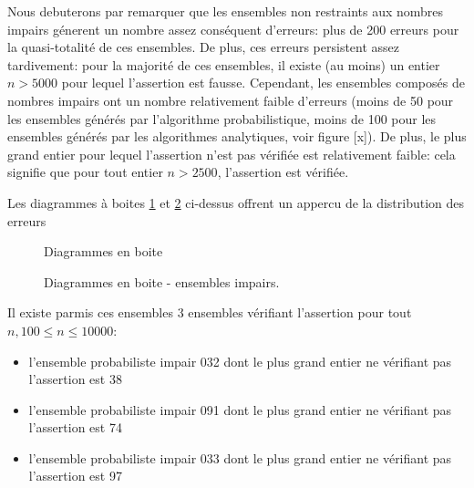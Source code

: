 \documentclass[../main.text]{report}
\begin{document}
Nous debuterons par remarquer que les ensembles non restraints aux nombres impairs génerent un nombre assez conséquent d'erreurs: plus de 200 erreurs pour la quasi-totalité de ces ensembles. 
De plus, ces erreurs persistent assez tardivement: pour la majorité de ces ensembles, il existe (au moins) un entier $n > 5000$ pour lequel l'assertion est fausse.
Cependant, les ensembles composés de nombres impairs ont un nombre relativement faible d'erreurs (moins de 50 pour les ensembles générés par l'algorithme probabilistique, moins de 100 pour les ensembles générés par les algorithmes analytiques, voir figure [x]). 
De plus, le plus grand entier pour lequel l'assertion n'est pas vérifiée est relativement faible: cela signifie que pour tout entier $n > 2500$, l'assertion est vérifiée.  


Les diagrammes à boites \ref{fig:boxplots} et \ref{fig:boxplots_Odd} ci-dessus offrent un appercu de la distribution des erreurs

\begin{figure}[H]
\centering
	\caption{Diagrammes en boite}
	\label{fig:boxplots}
\end{figure}

\begin{figure}[H]
\centering
	\caption{Diagrammes en boite - ensembles impairs.}
	\label{fig:boxplots_Odd}
\end{figure}
Il existe parmis ces ensembles 3 ensembles vérifiant l'assertion pour tout $n, 100 \leq n \leq 10000$:
\begin{itemize}
	\item l'ensemble probabiliste impair 032 dont le plus grand entier ne vérifiant pas l'assertion est 38
	\item l'ensemble probabiliste impair 091 dont le plus grand entier ne vérifiant pas l'assertion est 74
	\item l'ensemble probabiliste impair 033 dont le plus grand entier ne vérifiant pas l'assertion est 97
\end{itemize}
\end{document}
